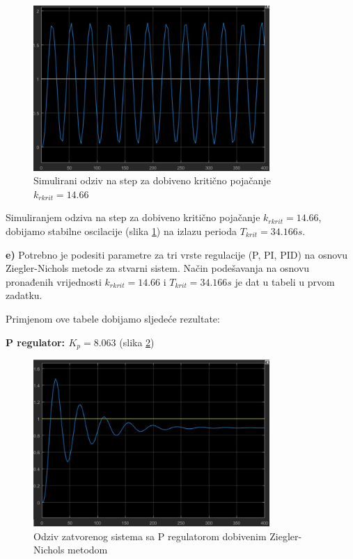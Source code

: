 \begin{figure} [H]
  \centering
  \includegraphics[width=0.8\textwidth]{z2_15}
  \caption{Simulirani odziv na step za dobiveno kritično pojačanje  $k_{rkrit}=14.66$}
  \label{fig:z2_15}
\end{figure}


Simuliranjem odziva na step za dobiveno kritično pojačanje $k_{rkrit}=14.66$, dobijamo stabilne oscilacije (slika \ref{fig:z2_15}) na izlazu perioda $T_{krit}=34.166s$. 


\textbf{e)} Potrebno je podesiti parametre za tri vrste regulacije (P, PI, PID) na osnovu Ziegler-Nichols metode za stvarni sistem. Način podešavanja na osnovu pronađenih vrijednosti $k_{rkrit}=14.66$ i $T_{krit}=34.166s$ je dat u tabeli u prvom zadatku. 

Primjenom ove tabele dobijamo sljedeće rezultate:

\textbf{P regulator: $K_p=8.063$ }(slika \ref{fig:z2_16})
 
\begin{figure} [H]
  \centering
  \includegraphics[width=0.8\textwidth]{z2_16}
  \caption{Odziv zatvorenog sistema sa P regulatorom dobivenim Ziegler-Nichols metodom}
  \label{fig:z2_16}
\end{figure}

